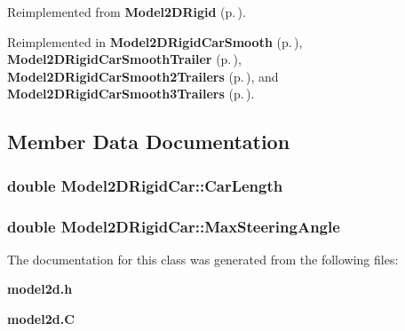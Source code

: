 Reimplemented from {\bf Model2DRigid} {\rm (p.\,\pageref{classModel2DRigid_a3})}.

Reimplemented in {\bf Model2DRigid\-Car\-Smooth} {\rm (p.\,\pageref{classModel2DRigidCarSmooth_a2})}, {\bf Model2DRigid\-Car\-Smooth\-Trailer} {\rm (p.\,\pageref{classModel2DRigidCarSmoothTrailer_a2})}, {\bf Model2DRigid\-Car\-Smooth2Trailers} {\rm (p.\,\pageref{classModel2DRigidCarSmooth2Trailers_a2})}, and {\bf Model2DRigid\-Car\-Smooth3Trailers} {\rm (p.\,\pageref{classModel2DRigidCarSmooth3Trailers_a2})}.

\subsection{Member Data Documentation}
\subsubsection{\setlength{\rightskip}{0pt plus 5cm}double Model2DRigid\-Car::Car\-Length}\label{classModel2DRigidCar_m1}


\subsubsection{\setlength{\rightskip}{0pt plus 5cm}double Model2DRigid\-Car::Max\-Steering\-Angle}\label{classModel2DRigidCar_m0}




The documentation for this class was generated from the following files:\begin{CompactItemize}
\item 
{\bf model2d.h}\item 
{\bf model2d.C}\end{CompactItemize}

